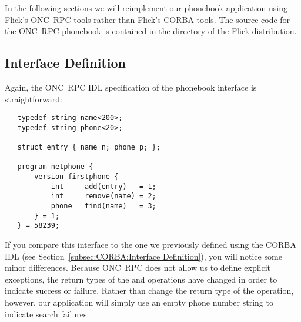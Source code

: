 

In the following sections we will reimplement our phonebook application using
Flick's ONC~RPC tools rather than Flick's CORBA tools.  The source code for the
ONC~RPC phonebook is contained in the 
directory of the Flick distribution.



\subsection{Interface Definition}
\label{subsec:ONCRPC:Interface Definition}

Again, the ONC~RPC IDL specification of the phonebook interface is
straightforward:

\begin{verbatim}
   typedef string name<200>;
   typedef string phone<20>;

   struct entry { name n; phone p; };

   program netphone {
       version firstphone {
           int     add(entry)   = 1;
           int     remove(name) = 2;
           phone   find(name)   = 3;
       } = 1;
   } = 58239;
\end{verbatim}

If you compare this interface to the one we previously defined using the CORBA
IDL (see Section~\ref{subsec:CORBA:Interface Definition}), you will notice some
minor differences.  Because ONC~RPC does not allow us to define explicit
exceptions, the return types of the  and  operations have
changed in order to indicate success or failure.  Rather than change the return
type of the  operation, however, our application will simply use an
empty phone number string to indicate search failures.


